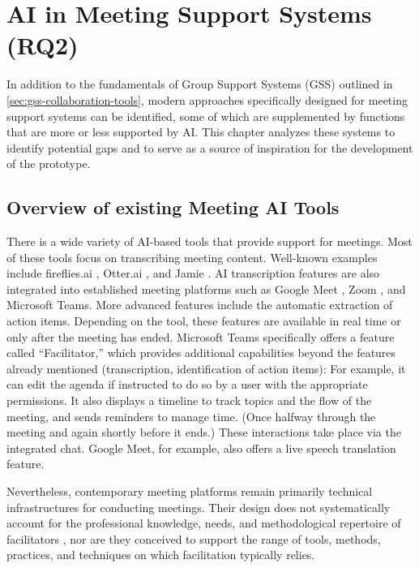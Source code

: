 \section{AI in Meeting Support Systems (RQ2)}

In addition to the fundamentals of Group Support Systems (GSS) outlined in
\autoref{sec:gss-collaboration-tools}, modern approaches
specifically designed for meeting support systems can be identified, some of which are supplemented by
functions that are more or less supported by AI. This chapter analyzes these systems to identify potential
gaps and to serve as a source of inspiration for the development of the prototype.

\subsection{Overview of existing Meeting AI Tools}
\label{sec:existing-meeting-ai-tools}
There is a wide variety of AI-based tools that provide support for meetings. Most of these tools focus on
transcribing meeting content. Well-known examples include fireflies.ai \cite{Firefliesai1AI}, Otter.ai
\cite{otteraiOtterMeetingAgent}, and Jamie \cite{jamieaiJamieYourPersonal}.
AI transcription features are also integrated into established meeting platforms such as Google Meet
\cite{workspaceGoogleMeetTelefon}, Zoom \cite{zoomKINotizentoolIhrKIMeetingAssistent},
and Microsoft Teams. \cite{microsoftVideokonferenzenBesprechungenAnrufe}
More advanced features include the automatic extraction of action items. Depending on the tool, these
features are available in real time or only after the meeting has ended.
Microsoft Teams specifically offers a feature called “Facilitator,” \cite{microsoftSetFacilitatorMicrosoft}
which provides additional capabilities beyond the features already mentioned (transcription, identification
of action items): For example, it can edit the agenda if instructed to do so by a user with the appropriate
permissions. It also displays a timeline to track topics and the flow of the meeting, and sends reminders to
manage time. (Once halfway through the meeting and again shortly before it ends.) These interactions take
place via the integrated chat.
Google Meet, for example, also offers a live speech translation feature. \cite{googleLearnSpeechTranslation}

Nevertheless, contemporary meeting platforms remain primarily technical infrastructures for conducting
meetings. Their design does not systematically account for the professional knowledge, needs, and
methodological repertoire of facilitators \cite{hughesKeeperSynchronousOnline2021}, nor are they conceived to
support the range of tools, methods, practices, and techniques on which facilitation typically relies.


